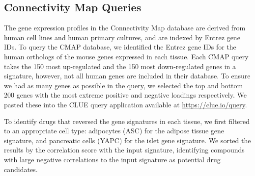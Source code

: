 \documentclass[
]{article}
\begin{document}
\subsection{Connectivity Map Queries}\label{connectivity-map-queries}

The gene expression profiles in the Connectivity Map database are
derived from human cell lines and human primary cultures, and are
indexed by Entrez gene IDs. To query the CMAP database, we identified
the Entrez gene IDs for the human orthologs of the mouse genes expressed
in each tissue. Each CMAP query takes the 150 most up-regulated and the
150 most down-regulated genes in a signature, however, not all human
genes are included in their database. To ensure we had as many genes as
possible in the query, we selected the top and bottom 200 genes with the
most extreme positive and negative loadings respectively. We pasted
these into the CLUE query application available at
\url{https://clue.io/query}.

To identify drugs that reversed the gene signatures in each tissue, we
first filtered to an appropriate cell type: adipocytes (ASC) for the
adipose tissue gene signature, and pancreatic cells (YAPC) for the islet
gene signature. We sorted the results by the correlation score with the
input signature, identifying compounds with large negative correlations
to the input signature as potential drug candidates.



\end{document}

